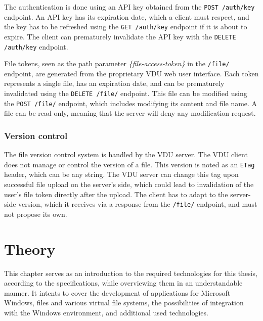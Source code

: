 The authentication is done using an API key obtained from the \lstinline{POST /auth/key} endpoint. An API key has its expiration date, which a client must respect, and the key has to be refreshed using the \lstinline{GET /auth/key} endpoint if it is about to expire. The client can prematurely invalidate the API key with the \lstinline{DELETE /auth/key} endpoint.

File tokens, seen as the path parameter \textit{\{file-access-token\}} in the \lstinline{/file/} endpoint, are generated from the proprietary VDU web user interface. Each token represents a single file, has an expiration date, and can be prematurely invalidated using the \lstinline{DELETE /file/} endpoint. This file can be modified using the \lstinline{POST /file/} endpoint, which includes modifying its content and file name. A file can be read-only, meaning that the server will deny any modification request.

\subsection{Version control}
The file version control system is handled by the VDU server. The VDU client does not manage or control the version of a file. This version is noted as an \lstinline{ETag} header, which can be any string. The VDU server can change this tag upon successful file upload on the server's side, which could lead to invalidation of the user's file token directly after the upload. The client has to adapt to the server-side version, which it receives via a response from the \lstinline{/file/} endpoint, and must not propose its own.




\chapter{Theory}
\label{ch_theory}
This chapter serves as an introduction to the required technologies for this thesis, according to the specifications, while overviewing them in an understandable manner. It intents to cover the development of applications for Microsoft Windows, files and various virtual file systems, the possibilities of integration with the Windows environment, and additional used technologies.

